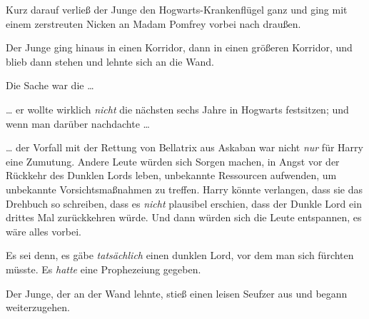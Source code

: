 Kurz darauf verließ der Junge den Hogwarts-Krankenflügel ganz und ging mit einem zerstreuten Nicken an Madam Pomfrey vorbei nach draußen.

Der Junge ging hinaus in einen Korridor, dann in einen größeren Korridor, und blieb dann stehen und lehnte sich an die Wand.

Die Sache war die …

… er wollte wirklich \emph{nicht} die nächsten sechs Jahre in Hogwarts festsitzen; und wenn man darüber nachdachte …

… der Vorfall mit der Rettung von Bellatrix aus Askaban war nicht \emph{nur} für Harry eine Zumutung. Andere Leute würden sich Sorgen machen, in Angst vor der Rückkehr des Dunklen Lords leben, unbekannte Ressourcen aufwenden, um unbekannte Vorsichtsmaßnahmen zu treffen. Harry könnte verlangen, dass sie das Drehbuch so schreiben, dass es \emph{nicht} plausibel erschien, dass der Dunkle Lord ein drittes Mal zurückkehren würde. Und dann würden sich die Leute entspannen, es wäre alles vorbei.

Es sei denn, es gäbe \emph{tatsächlich} einen dunklen Lord, vor dem man sich fürchten müsste. Es \emph{hatte} eine Prophezeiung gegeben.

Der Junge, der an der Wand lehnte, stieß einen leisen Seufzer aus und begann weiterzugehen.

